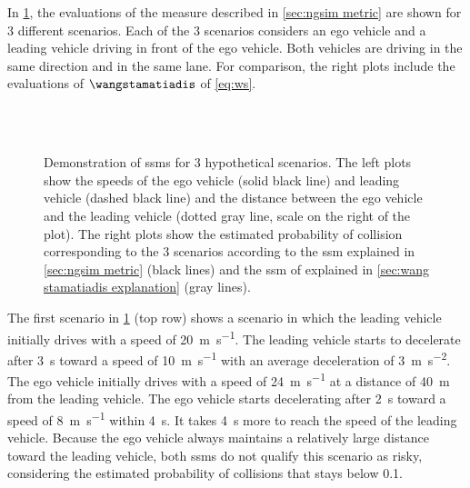 In \cref{fig:scenarios}, the evaluations of the measure described in \cref{sec:ngsim metric} are shown for 3 different scenarios. 
Each of the 3 scenarios considers an ego vehicle and a leading vehicle driving in front of the ego vehicle.
Both vehicles are driving in the same direction and in the same lane. 
For comparison, the right plots include the evaluations of $\wangstamatiadis$ of \cref{eq:ws}.

\setlength{\figurewidth}{.45\linewidth}
\setlength{\figureheight}{0.6\figurewidth}
\begin{figure}
	\centering
	
	\\
	
	\\
	
	
	\caption{Demonstration of \acp{ssm} for 3 hypothetical scenarios. 
		The left plots show the speeds of the ego vehicle (solid black line) and leading vehicle (dashed black line) and the distance between the ego vehicle and the leading vehicle (dotted gray line, scale on the right of the plot).
		The right plots show the estimated probability of collision corresponding to the 3 scenarios according to the \ac{ssm} explained in \cref{sec:ngsim metric} (black lines) and the \ac{ssm} of \textcite{wang2014evaluation} explained in \cref{sec:wang stamatiadis explanation} (gray lines).}
	\label{fig:scenarios}		
\end{figure}

The first scenario in \cref{fig:scenarios} (top row) shows a scenario in which the leading vehicle initially drives with a speed of \SI{20}{\meter\per\second}.
The leading vehicle starts to decelerate after \SI{3}{\second} toward a speed of \SI{10}{\meter\per\second} with an average deceleration of \SI{3}{\meter\per\second\squared}.
The ego vehicle initially drives with a speed of \SI{24}{\meter\per\second} at a distance of \SI{40}{\meter} from the leading vehicle.
The ego vehicle starts decelerating after \SI{2}{\second} toward a speed of \SI{8}{\meter\per\second} within \SI{4}{\second}.
It takes \SI{4}{\second} more to reach the speed of the leading vehicle.
Because the ego vehicle always maintains a relatively large distance toward the leading vehicle, both \acp{ssm} do not qualify this scenario as risky, considering the estimated probability of collisions that stays below 0.1.

